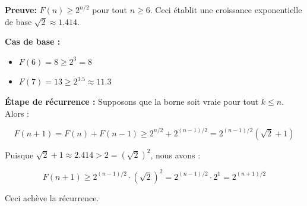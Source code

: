 \begin{Exercice} [5 minutes]
\begin{solution}
        \textbf{Preuve: } $F(n) \ge 2^{n/2}$ pour tout $n \ge 6$.
        Ceci établit une croissance exponentielle de base $\sqrt{2} \approx 1.414$.

        \textbf{Cas de base :}
        \begin{itemize}
            \item $F(6) = 8 \ge 2^3 = 8$ 
            \item $F(7) = 13 \ge 2^{3.5} \approx 11.3$ 
        \end{itemize}
    \end{solution}
    \begin{solution}

        \textbf{Étape de récurrence :} Supposons que la borne soit vraie pour tout $k \le n$. Alors :

        $$F(n + 1) = F(n) + F(n - 1) \ge 2^{n/2} + 2^{(n-1)/2} = 2^{(n-1)/2}(\sqrt{2} + 1)$$

        Puisque $\sqrt{2} + 1 \approx 2.414 > 2 = (\sqrt{2})^2$, nous avons :

        $$F(n + 1) \ge 2^{(n-1)/2} \cdot (\sqrt{2})^2 = 2^{(n-1)/2} \cdot 2^1 = 2^{(n+1)/2} $$

        Ceci achève la récurrence. 
    \end{solution}
\end{Exercice}

